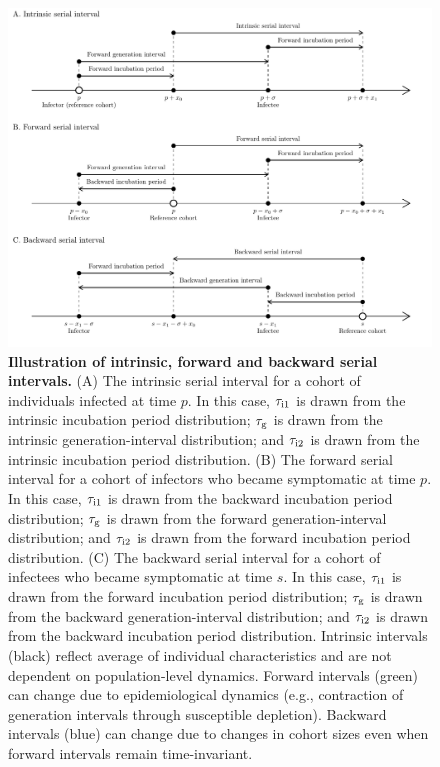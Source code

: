 \documentclass[12pt]{article}
\newcommand{\psymp}{\ensuremath{p}} %
\newcommand{\ssymp}{\ensuremath{s}} %
\newcommand{\gtime}{\tau_{\rm g}} %
\begin{document}
\begin{figure}[!th]
\includegraphics[width=\textwidth]{serial_guide.pdf}
\caption{
\textbf{Illustration of intrinsic,
    forward and backward serial intervals.}  (A) The intrinsic serial
  interval for a cohort of individuals infected at time $\psymp$.  In
  this case, $\tau_{\rm i1}$ is drawn from the intrinsic incubation period
  distribution; $\gtime$ is drawn from the intrinsic generation-interval
  distribution; and $\tau_{\rm i2}$ is drawn from the intrinsic incubation period
  distribution.  (B) The forward serial interval for a cohort of
  infectors who became symptomatic at time $\psymp$.  In this case,
  $\tau_{\rm i1}$ is drawn from the backward incubation period distribution; $\gtime$
  is drawn from the forward generation-interval distribution; and $\tau_{\rm i2}$
  is drawn from the forward incubation period distribution.  (C) The
  backward serial interval for a cohort of infectees who became
  symptomatic at time \ssymp.  In this case, $\tau_{\rm i1}$ is drawn from the
  forward incubation period distribution; $\gtime$ is drawn from the
  backward generation-interval distribution; and $\tau_{\rm i2}$ is drawn from the
  backward incubation period distribution.
  Intrinsic intervals (black) reflect average of individual characteristics and are not dependent on population-level dynamics.
  Forward intervals (green) can change due to epidemiological dynamics (e.g., contraction of generation intervals through susceptible depletion).
  Backward intervals (blue) can change due to changes in cohort sizes even when forward intervals remain time-invariant.
}
\label{fig:diagram}
\end{figure}
\end{document}
